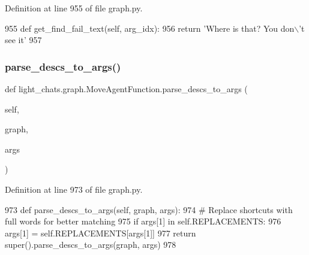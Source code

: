 Definition at line 955 of file graph.\+py.


\begin{DoxyCode}
955     \textcolor{keyword}{def }get\_find\_fail\_text(self, arg\_idx):
956         \textcolor{keywordflow}{return} \textcolor{stringliteral}{'Where is that? You don\(\backslash\)'t see it'}
957 
\end{DoxyCode}
\mbox{\label{classlight__chats_1_1graph_1_1MoveAgentFunction_ac5ec1d33013cd1b2692d291f328e9a7b}} 
\subsubsection{\texorpdfstring{parse\+\_\+descs\+\_\+to\+\_\+args()}{parse\_descs\_to\_args()}}
{\footnotesize\ttfamily def light\+\_\+chats.\+graph.\+Move\+Agent\+Function.\+parse\+\_\+descs\+\_\+to\+\_\+args (\begin{DoxyParamCaption}\item[{}]{self,  }\item[{}]{graph,  }\item[{}]{args }\end{DoxyParamCaption})}



Definition at line 973 of file graph.\+py.


\begin{DoxyCode}
973     \textcolor{keyword}{def }parse\_descs\_to\_args(self, graph, args):
974         \textcolor{comment}{# Replace shortcuts with full words for better matching}
975         \textcolor{keywordflow}{if} args[1] \textcolor{keywordflow}{in} self.REPLACEMENTS:
976             args[1] = self.REPLACEMENTS[args[1]]
977         \textcolor{keywordflow}{return} super().parse\_descs\_to\_args(graph, args)
978 
\end{DoxyCode}
\mbox{\label{classlight__chats_1_1graph_1_1MoveAgentFunction_a107669f4e89172a53ac33649b9426439}} 
